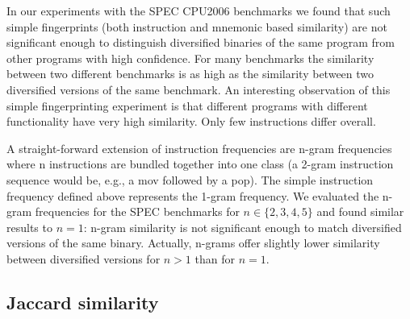 \documentclass[letterpaper,twocolumn,10pt]{article}
\begin{document}

In our experiments with the SPEC CPU2006 benchmarks we found that such simple
fingerprints (both instruction and mnemonic based similarity) are not
significant enough to distinguish diversified binaries of the same program from
other programs with high confidence. For many benchmarks the similarity between
two different benchmarks is as high as the similarity between two diversified
versions of the same benchmark. An interesting observation of this simple
fingerprinting experiment is that different programs with different
functionality have very high similarity. Only few instructions differ overall.

A straight-forward extension of instruction frequencies are n-gram frequencies
where n instructions are bundled together into one class (a 2-gram instruction
sequence would be, e.g., a mov followed by a pop). The simple instruction
frequency defined above represents the 1-gram frequency. We evaluated the
n-gram frequencies for the SPEC benchmarks for $n \in \{2, 3, 4, 5\}$ and found
similar results to $n = 1$: n-gram similarity is not significant enough to match
diversified versions of the same binary. Actually, n-grams offer slightly lower
similarity between diversified versions for $n > 1$ than for $n = 1$.

\subsection{Jaccard similarity}
\end{document}

